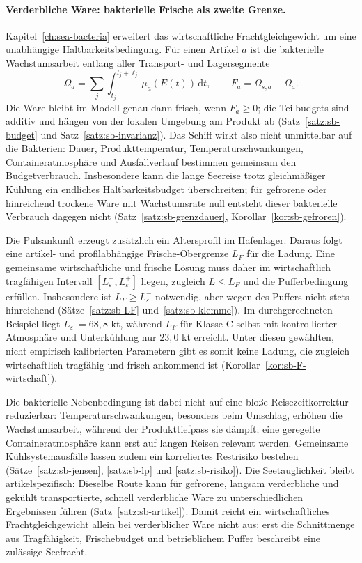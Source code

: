 \documentclass[a4paper, 12pt, twoside, openright]{report}
\theoremstyle{definition}
\theoremstyle{definition}
\begin{document}
\paragraph{Verderbliche Ware: bakterielle Frische als zweite Grenze.}
Kapitel~\ref{ch:sea-bacteria} erweitert das wirtschaftliche Frachtgleichgewicht um eine
unabhängige Haltbarkeitsbedingung. Für einen Artikel $a$ ist die bakterielle
Wachstumsarbeit entlang aller Transport- und Lagersegmente
\[
  \Omega_a=\sum_j\int_{t_j}^{t_j+\ell_j}\mu_a(E(t))\,\mathrm{d}t,
  \qquad F_a=\Omega_{s,a}-\Omega_a.
\]
Die Ware bleibt im Modell genau dann frisch, wenn $F_a\ge0$; die Teilbudgets sind
additiv und hängen von der lokalen Umgebung am Produkt ab
(Satz~\ref{satz:sb-budget} und Satz~\ref{satz:sb-invarianz}). Das Schiff wirkt also
nicht unmittelbar auf die Bakterien: Dauer, Produkttemperatur, Temperaturschwankungen,
Containeratmosphäre und Ausfallverlauf bestimmen gemeinsam den Budgetverbrauch.
Insbesondere kann die lange Seereise trotz gleichmäßiger Kühlung ein endliches
Haltbarkeitsbudget überschreiten; für gefrorene oder hinreichend trockene Ware mit
Wachstumsrate null entsteht dieser bakterielle Verbrauch dagegen nicht
(Satz~\ref{satz:sb-grenzdauer}, Korollar~\ref{kor:sb-gefroren}).

Die Pulsankunft erzeugt zusätzlich ein Altersprofil im Hafenlager. Daraus folgt eine
artikel- und profilabhängige Frische-Obergrenze $L_F$ für die Ladung. Eine gemeinsame
wirtschaftliche und frische Lösung muss daher im wirtschaftlich tragfähigen Intervall
$[L^-_\varepsilon,L^+_\varepsilon]$ liegen, zugleich $L\le L_F$ und die Pufferbedingung
erfüllen. Insbesondere ist $L_F\ge L^-_\varepsilon$ notwendig, aber wegen des Puffers
nicht stets hinreichend (Sätze~\ref{satz:sb-LF} und~\ref{satz:sb-klemme}). Im durchgerechneten
Beispiel liegt $L^-_\varepsilon=68{,}8$ kt, während $L_F$ für Klasse C selbst mit
kontrollierter Atmosphäre und Unterkühlung nur $23{,}0$ kt erreicht. Unter diesen
gewählten, nicht empirisch kalibrierten Parametern gibt es somit keine Ladung, die
zugleich wirtschaftlich tragfähig und frisch ankommend ist
(Korollar~\ref{kor:sb-F-wirtschaft}).

Die bakterielle Nebenbedingung ist dabei nicht auf eine bloße Reisezeitkorrektur
reduzierbar: Temperaturschwankungen, besonders beim Umschlag, erhöhen die
Wachstumsarbeit, während der Produkttiefpass sie dämpft; eine geregelte
Containeratmosphäre kann erst auf langen Reisen relevant werden. Gemeinsame
Kühlsystemausfälle lassen zudem ein korreliertes Restrisiko bestehen
(Sätze~\ref{satz:sb-jensen}, \ref{satz:sb-lp} und \ref{satz:sb-risiko}). Die
Seetauglichkeit bleibt artikelspezifisch: Dieselbe Route kann für gefrorene, langsam
verderbliche und gekühlt transportierte, schnell verderbliche Ware zu unterschiedlichen Ergebnissen
führen (Satz~\ref{satz:sb-artikel}). Damit reicht ein wirtschaftliches
Frachtgleichgewicht allein bei verderblicher Ware nicht aus; erst die Schnittmenge
aus Tragfähigkeit, Frischebudget und betrieblichem Puffer beschreibt eine zulässige
Seefracht.
\end{document}
